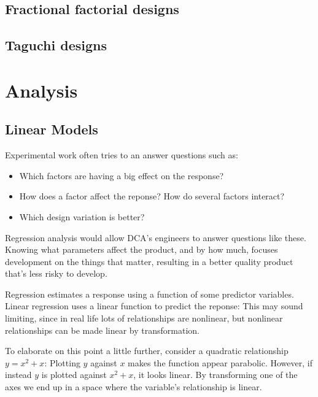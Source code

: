 \documentclass[11pt,a4paper,article]{memoir} %
\begin{document}
\subsection*{Fractional factorial designs}
\subsection*{Taguchi designs}

\section{Analysis}
\subsection*{Linear Models}
Experimental work often tries to an answer questions such as:
\vspace{-10pt}
\begin{itemize}
\item Which factors are having a big effect on the response?
\item How does a factor affect the reponse? How do several factors interact?
\item Which design variation is better?
\end{itemize}
\vspace{-10pt}
 Regression analysis would allow DCA's engineers to answer questions like these. Knowing what parameters affect the product, and by how much,  focuses development on the things that matter, resulting in a better quality product that's less risky to develop.
 \par
 Regression estimates a response using a function of some predictor variables. Linear regression uses a linear function to predict the reponse: This may sound limiting, since in real life lots of relationships are nonlinear, but nonlinear relationships can be made linear by transformation.
 \par
  To elaborate on this point a little further, consider a quadratic relationship $y = x^2 + x$: Plotting $y$ against $x$ makes the function appear parabolic. However, if instead $y$ is plotted against $x^2 + x$, it looks linear. By transforming one of the axes we end up in a space where the variable's relationship is linear.
\end{document}
